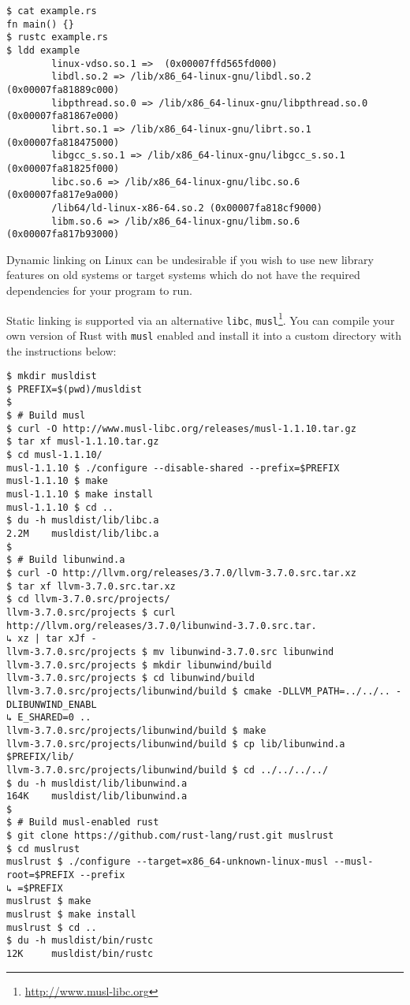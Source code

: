 \documentclass[a4paper,]{book}
\renewcommand{\href}[2]{#2\footnote{\url{#1}}}
\begin{document}
\begin{verbatim}
$ cat example.rs
fn main() {}
$ rustc example.rs
$ ldd example
        linux-vdso.so.1 =>  (0x00007ffd565fd000)
        libdl.so.2 => /lib/x86_64-linux-gnu/libdl.so.2 (0x00007fa81889c000)
        libpthread.so.0 => /lib/x86_64-linux-gnu/libpthread.so.0 (0x00007fa81867e000)
        librt.so.1 => /lib/x86_64-linux-gnu/librt.so.1 (0x00007fa818475000)
        libgcc_s.so.1 => /lib/x86_64-linux-gnu/libgcc_s.so.1 (0x00007fa81825f000)
        libc.so.6 => /lib/x86_64-linux-gnu/libc.so.6 (0x00007fa817e9a000)
        /lib64/ld-linux-x86-64.so.2 (0x00007fa818cf9000)
        libm.so.6 => /lib/x86_64-linux-gnu/libm.so.6 (0x00007fa817b93000)
\end{verbatim}

Dynamic linking on Linux can be undesirable if you wish to use new
library features on old systems or target systems which do not have the
required dependencies for your program to run.

Static linking is supported via an alternative \texttt{libc},
\href{http://www.musl-libc.org}{\texttt{musl}}. You can compile your own
version of Rust with \texttt{musl} enabled and install it into a custom
directory with the instructions below:

\begin{verbatim}
$ mkdir musldist
$ PREFIX=$(pwd)/musldist
$
$ # Build musl
$ curl -O http://www.musl-libc.org/releases/musl-1.1.10.tar.gz
$ tar xf musl-1.1.10.tar.gz
$ cd musl-1.1.10/
musl-1.1.10 $ ./configure --disable-shared --prefix=$PREFIX
musl-1.1.10 $ make
musl-1.1.10 $ make install
musl-1.1.10 $ cd ..
$ du -h musldist/lib/libc.a
2.2M    musldist/lib/libc.a
$
$ # Build libunwind.a
$ curl -O http://llvm.org/releases/3.7.0/llvm-3.7.0.src.tar.xz
$ tar xf llvm-3.7.0.src.tar.xz
$ cd llvm-3.7.0.src/projects/
llvm-3.7.0.src/projects $ curl http://llvm.org/releases/3.7.0/libunwind-3.7.0.src.tar.
↳ xz | tar xJf -
llvm-3.7.0.src/projects $ mv libunwind-3.7.0.src libunwind
llvm-3.7.0.src/projects $ mkdir libunwind/build
llvm-3.7.0.src/projects $ cd libunwind/build
llvm-3.7.0.src/projects/libunwind/build $ cmake -DLLVM_PATH=../../.. -DLIBUNWIND_ENABL
↳ E_SHARED=0 ..
llvm-3.7.0.src/projects/libunwind/build $ make
llvm-3.7.0.src/projects/libunwind/build $ cp lib/libunwind.a $PREFIX/lib/
llvm-3.7.0.src/projects/libunwind/build $ cd ../../../../
$ du -h musldist/lib/libunwind.a
164K    musldist/lib/libunwind.a
$
$ # Build musl-enabled rust
$ git clone https://github.com/rust-lang/rust.git muslrust
$ cd muslrust
muslrust $ ./configure --target=x86_64-unknown-linux-musl --musl-root=$PREFIX --prefix
↳ =$PREFIX
muslrust $ make
muslrust $ make install
muslrust $ cd ..
$ du -h musldist/bin/rustc
12K     musldist/bin/rustc
\end{verbatim}
\end{document}
